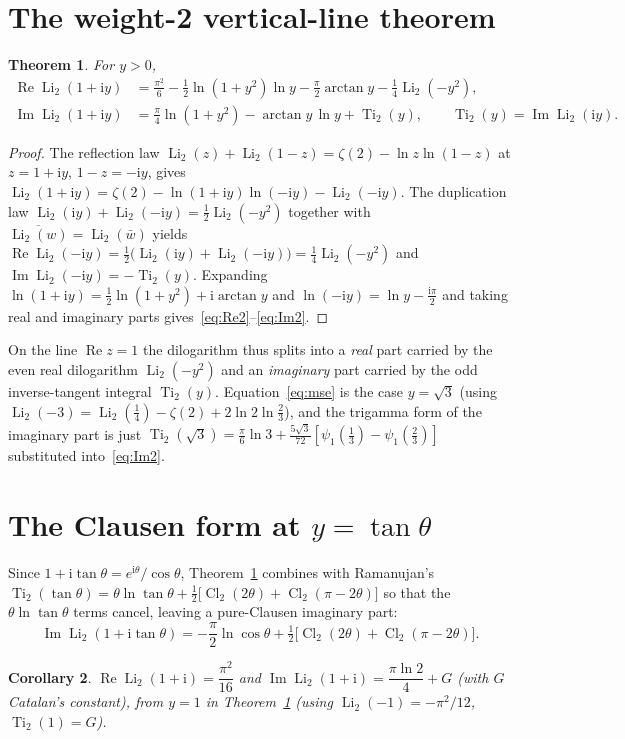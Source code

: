\documentclass[11pt]{article}
\DeclareMathOperator{\Li}{Li}
\DeclareMathOperator{\Ti}{Ti}
\DeclareMathOperator{\Cl}{Cl}
\newcommand{\iu}{\mathrm{i}}
\newcommand{\Real}{\operatorname{Re}}
\newcommand{\Imag}{\operatorname{Im}}
\theoremstyle{plain}\newtheorem{theorem}{Theorem}\newtheorem{proposition}[theorem]{Proposition}
\newtheorem{corollary}[theorem]{Corollary}
\theoremstyle{remark}\newtheorem{remark}[theorem]{Remark}
\begin{document}
\section{The weight-2 vertical-line theorem}
\begin{theorem}\label{thm:wt2}
For $y>0$,
\begin{align}
  \Real\Li_2(1+\iu y)&=\frac{\pi^2}{6}-\tfrac12\ln(1{+}y^2)\ln y-\frac\pi2\arctan y-\tfrac14\Li_2(-y^2),
  \label{eq:Re2}\\
  \Imag\Li_2(1+\iu y)&=\frac\pi4\ln(1{+}y^2)-\arctan y\,\ln y+\Ti_2(y),\qquad \Ti_2(y)=\Imag\Li_2(\iu y).
  \label{eq:Im2}
\end{align}
\end{theorem}
\begin{proof}
The reflection law $\Li_2(z)+\Li_2(1-z)=\zeta(2)-\ln z\ln(1-z)$ at $z=1+\iu y$, $1-z=-\iu y$, gives
$\Li_2(1+\iu y)=\zeta(2)-\ln(1+\iu y)\ln(-\iu y)-\Li_2(-\iu y)$. The duplication law
$\Li_2(\iu y)+\Li_2(-\iu y)=\tfrac12\Li_2(-y^2)$ together with $\overline{\Li_2(w)}=\Li_2(\bar w)$ yields
$\Real\Li_2(-\iu y)=\tfrac12\bigl(\Li_2(\iu y)+\Li_2(-\iu y)\bigr)=\tfrac14\Li_2(-y^2)$ and
$\Imag\Li_2(-\iu y)=-\Ti_2(y)$. Expanding $\ln(1+\iu y)=\tfrac12\ln(1{+}y^2)+\iu\arctan y$ and
$\ln(-\iu y)=\ln y-\tfrac{\iu\pi}2$ and taking real and imaginary parts gives~\eqref{eq:Re2}--\eqref{eq:Im2}.
\end{proof}
On the line $\Real z=1$ the dilogarithm thus splits into a \emph{real} part carried by the even real
dilogarithm $\Li_2(-y^2)$ and an \emph{imaginary} part carried by the odd inverse-tangent integral
$\Ti_2(y)$. Equation~\eqref{eq:mse} is the case $y=\sqrt3$ (using
$\Li_2(-3)=\Li_2(\tfrac14)-\zeta(2)+2\ln2\ln\tfrac23$), and the trigamma form of the imaginary part is just
$\Ti_2(\sqrt3)=\tfrac{\pi}6\ln3+\tfrac{5\sqrt3}{72}[\psi_1(\tfrac13)-\psi_1(\tfrac23)]$ substituted
into~\eqref{eq:Im2}.

\section{The Clausen form at $y=\tan\theta$}
Since $1+\iu\tan\theta=e^{\iu\theta}/\cos\theta$, Theorem~\ref{thm:wt2} combines with Ramanujan's
$\Ti_2(\tan\theta)=\theta\ln\tan\theta+\tfrac12\bigl[\Cl_2(2\theta)+\Cl_2(\pi-2\theta)\bigr]$ so that the
$\theta\ln\tan\theta$ terms cancel, leaving a pure-Clausen imaginary part:
\begin{equation}\label{eq:clausen}
  \Imag\Li_2(1+\iu\tan\theta)=-\frac\pi2\ln\cos\theta+\tfrac12\bigl[\Cl_2(2\theta)+\Cl_2(\pi-2\theta)\bigr].
\end{equation}
\begin{corollary}\label{cor:specials}
$\Real\Li_2(1+\iu)=\dfrac{\pi^2}{16}$ and $\Imag\Li_2(1+\iu)=\dfrac{\pi\ln2}{4}+G$ (with $G$ Catalan's
constant), from $y=1$ in Theorem~\ref{thm:wt2} (using $\Li_2(-1)=-\pi^2/12$, $\Ti_2(1)=G$).
\end{corollary}
\end{document}
